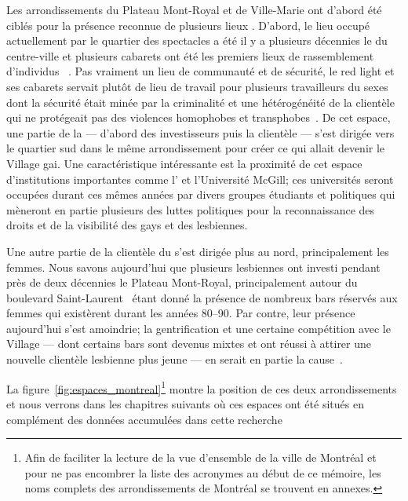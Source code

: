 Les arrondissements du Plateau Mont-Royal et de Ville-Marie ont d'abord été ciblés pour la présence reconnue de plusieurs lieux \qus{}. 
D'abord, le lieu occupé actuellement par le quartier des spectacles a été il y a plusieurs décennies le  du centre-ville et plusieurs cabarets ont été les premiers lieux de rassemblement d'individus \lgbt{}~\citep[198]{Podmore2015}.
Pas vraiment un lieu de communauté et de sécurité, le red light et ses cabarets servait plutôt de lieu de travail pour plusieurs travailleurs du sexes dont la sécurité était minée par la criminalité et une hétérogénéité de la clientèle qui ne protégeait pas des violences homophobes et transphobes~\parencite[91]{Higgins1999}. 
De cet espace, une partie de la  --- d'abord des investisseurs puis la clientèle --- s'est dirigée vers le quartier sud dans le même arrondissement pour créer ce qui allait devenir le Village gai. 
Une caractéristique intéressante est la proximité de cet espace d'institutions importantes comme l'\uqam{} et l'Université McGill; ces universités seront occupées durant ces mêmes années par divers groupes étudiants et politiques qui mèneront en partie plusieurs des luttes politiques pour la reconnaissance des droits et de la visibilité des gays et des lesbiennes.

Une autre partie de la clientèle \lgbt{} du  s'est dirigée plus au nord, principalement les femmes. 
Nous savons aujourd'hui que plusieurs lesbiennes ont investi pendant près de deux décennies le Plateau Mont-Royal, principalement autour du boulevard Saint-Laurent~\citep[599]{Podmore2006} étant donné la présence de nombreux bars réservés aux femmes qui existèrent durant les années 80--90. 
Par contre, leur présence aujourd'hui s'est amoindrie; la gentrification et une certaine compétition avec le Village --- dont certains bars sont devenus mixtes et ont réussi à attirer une nouvelle clientèle lesbienne plus jeune --- en serait en partie la cause~\citep{Podmore2015}.

La figure~\ref{fig:espaces_montreal}\footnote{Afin de faciliter la lecture de la   vue d'ensemble de la ville de Montréal et pour ne pas encombrer la liste des   acronymes au début de ce mémoire, les noms complets des arrondissements de   Montréal se trouvent en annexes.} montre la position de ces deux arrondissements et nous verrons dans les chapitres suivants où ces espaces ont été situés en complément des données accumulées dans cette recherche 

